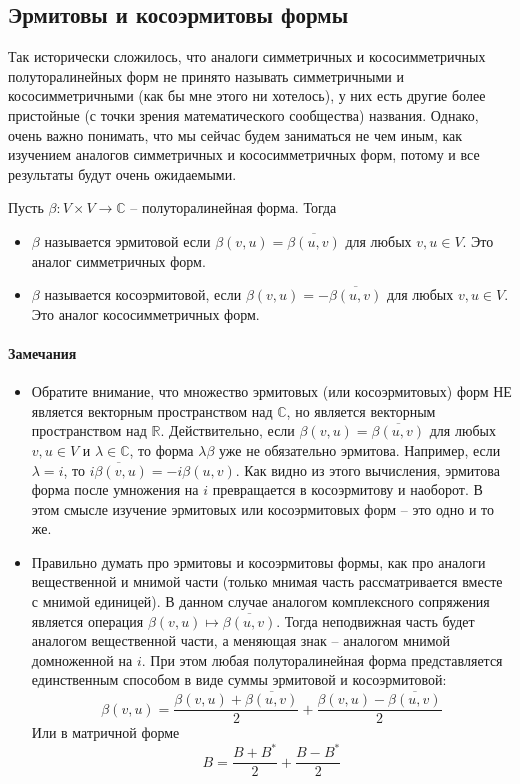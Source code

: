\subsection{Эрмитовы и косоэрмитовы формы}

Так исторически сложилось, что аналоги симметричных и кососимметричных полуторалинейных форм не принято называть симметричными и кососимметричными (как бы мне этого ни хотелось), у них есть другие более пристойные (с точки зрения математического сообщества) названия. Однако, очень важно понимать, что мы сейчас будем заниматься не чем иным, как изучением аналогов симметричных  и кососимметричных форм, потому и все результаты будут очень ожидаемыми.

\begin{definition}
Пусть $\beta\colon V\times V\to \mathbb C$ -- полуторалинейная форма. Тогда 
\begin{itemize}
\item $\beta$ называется эрмитовой если $\beta(v, u) = \overline{\beta(u,v)}$ для любых $v,u\in V$. Это аналог симметричных форм.

\item $\beta$ называется косоэрмитовой, если $\beta(v, u) = -\overline{\beta(u,v)}$ для любых $v,u\in V$. Это аналог кососимметричных форм.
\end{itemize}
\end{definition}

\paragraph{Замечания}
\begin{itemize}
\item Обратите внимание, что множество эрмитовых (или косоэрмитовых) форм НЕ является векторным пространством над $\mathbb C$, но является векторным пространством над $\mathbb R$. Действительно, если $\beta(v, u) = \overline{\beta(u,v)}$ для любых $v, u \in V$ и $\lambda\in \mathbb C$, то форма $\lambda \beta$ уже не обязательно эрмитова. Например, если $\lambda = i$, то $\overline{i\beta(v,u)} = -i \beta(u,v)$. Как видно из этого вычисления, эрмитова форма после умножения на $i$ превращается в косоэрмитову и наоборот. В этом смысле изучение эрмитовых или косоэрмитовых форм -- это одно и то же.

\item Правильно думать про эрмитовы и косоэрмитовы формы, как про аналоги вещественной и мнимой части (только мнимая часть рассматривается вместе с мнимой единицей). В данном случае аналогом комплексного сопряжения является операция $\beta(v,u) \mapsto \overline{\beta(u, v)}$. Тогда неподвижная часть будет аналогом вещественной части, а меняющая знак -- аналогом мнимой домноженной на $i$. При этом любая полуторалинейная форма представляется единственным способом в виде суммы эрмитовой и косоэрмитовой:
\[
\beta(v,u) = \frac{\beta(v, u) + \overline{\beta(u, v)}}{2} + \frac{\beta(v, u) - \overline{\beta(u, v)}}{2} 
\]
Или в матричной форме
\[
B = \frac{B + B^*}{2} + \frac{B - B^*}{2}
\]
\end{itemize}


